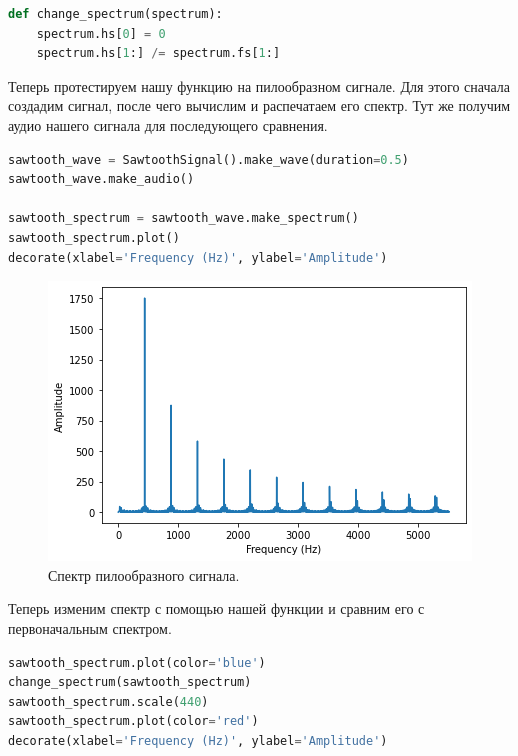 \documentclass[a4paper, 14pt]{extarticle}
\begin{document}
    \begin{lstlisting}[language=Python, caption= {Функция, изменяющая спектр.}, label={lst:task5_function}]
def change_spectrum(spectrum):
    spectrum.hs[0] = 0
    spectrum.hs[1:] /= spectrum.fs[1:]
    \end{lstlisting}

    Теперь протестируем нашу функцию на пилообразном сигнале. Для этого сначала создадим сигнал, после чего вычислим и распечатаем его спектр.
    Тут же получим аудио нашего сигнала для последующего сравнения.

    \begin{lstlisting}[language=Python, caption= Создание пилообразного сигнала и получение его спектра., label={lst:task5_spectrum}]
sawtooth_wave = SawtoothSignal().make_wave(duration=0.5)
sawtooth_wave.make_audio()

sawtooth_spectrum = sawtooth_wave.make_spectrum()
sawtooth_spectrum.plot()
decorate(xlabel='Frequency (Hz)', ylabel='Amplitude')
    \end{lstlisting}

    \begin{figure}[H]
        \centering
        \includegraphics[width=0.7\linewidth]{resources/Images/task5_spectrum}
        \caption{Спектр пилообразного сигнала.}
        \label{fig:task5_spectrum}
    \end{figure}

    Теперь изменим спектр с помощью нашей функции и сравним его с первоначальным спектром.

    \begin{lstlisting}[language=Python, caption= Изменение спектра и его сравнине с первоначальным спектром., label={lst:task5_compare_spectrum}]
sawtooth_spectrum.plot(color='blue')
change_spectrum(sawtooth_spectrum)
sawtooth_spectrum.scale(440)
sawtooth_spectrum.plot(color='red')
decorate(xlabel='Frequency (Hz)', ylabel='Amplitude')
    \end{lstlisting}
\end{document}
